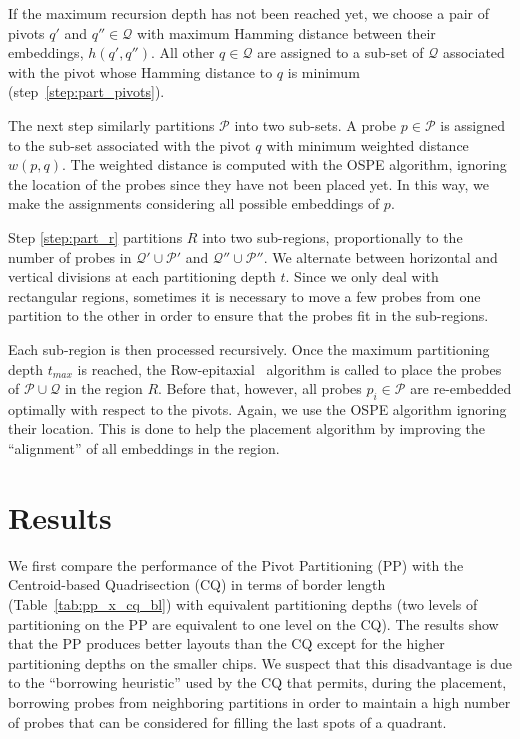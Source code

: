 \documentclass{llncs}
\begin{document}
If the maximum recursion depth has not been reached yet, we choose a pair of
pivots $q'$ and $q'' \in \mathcal{Q}$ with maximum Hamming distance
between their embeddings, $h(q',q'')$. All other $q \in \mathcal{Q}$ are
assigned to a sub-set of $\mathcal{Q}$ associated with the pivot whose
Hamming distance to $q$ is minimum (step~\ref{step:part_pivots}).

The next step similarly partitions $\mathcal{P}$ into two sub-sets. A probe
$p \in \mathcal{P}$ is assigned to the sub-set associated with the pivot $q$
with minimum weighted distance $w(p,q)$. The weighted distance is computed
with the OSPE algorithm, ignoring the location of the probes since they have
not been placed yet. In this way, we make the assignments considering all
possible embeddings of $p$.

Step \ref{step:part_r} partitions $R$ into two sub-regions, proportionally to the
number of probes in $\mathcal{Q}' \cup \mathcal{P}'$ and $\mathcal{Q}'' \cup \mathcal{P}''$.
We alternate between horizontal and vertical divisions at each partitioning depth $t$.
Since we only deal with rectangular regions, sometimes it is necessary to move
a few probes from one partition to the other in order to ensure that the probes
fit in the sub-regions.

Each sub-region is then processed recursively. Once the maximum partitioning depth
$t_{max}$ is reached, the Row-epitaxial~\cite{KAHNG03A} algorithm is
called to place the probes of $\mathcal{P} \cup \mathcal{Q}$ in the region $R$.
Before that, however, all probes $p_i \in \mathcal{P}$ are re-embedded optimally
with respect to the pivots. Again, we use the OSPE algorithm ignoring their location.
This is done to help the placement algorithm by improving the ``alignment'' of all
embeddings in the region.

\section{Results}
\label{sec:results}

We first compare the performance of the Pivot Partitioning (PP) with the
Centroid-based Quadrisection (CQ) in terms of border length
(Table~\ref{tab:pp_x_cq_bl}) with equivalent partitioning depths (two levels
of partitioning on the PP are equivalent to one level on the CQ). The results
show that the PP produces better layouts than the CQ except for the higher
partitioning depths on the smaller chips. We suspect that this disadvantage is
due to the ``borrowing heuristic'' used by the CQ that permits, during the placement,
borrowing probes from neighboring partitions in order to maintain a high number
of probes that can be considered for filling the last spots of a quadrant.
\end{document}
